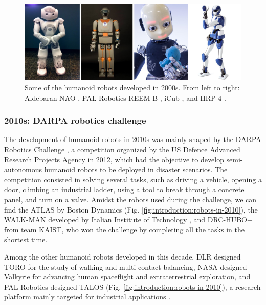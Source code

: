 \begin{figure}
    \centering
    \includegraphics[width=\textwidth]{figures/01-introduction/robots-in-2000.jpg}
    \caption{Some of the humanoid robots developed in 2000s. From left to right:
        Aldebaran NAO \cite{Gouaillier2008NAOHumanoid},
        PAL Robotics REEM-B \cite{Tellez2008REEMB},
        iCub \cite{Metta2010iCubHumanoid}, and
        HRP-4 \cite{Kaneko2011HRP4}.
    }
    \label{fig:introduction:robots-in-2000}
\end{figure}

\subsubsection{2010s: DARPA robotics challenge}
The development of humanoid robots in 2010s was mainly shaped by the DARPA
Robotics Challenge \cite{Atkeson2018DARPARoboticsChallenge}, a competition 
organized by the US Defence Advanced Research Projects Agency in 2012, which 
had the objective to develop semi-autonomous humanoid robots to be deployed
in disaster scenarios. The competition consisted in solving several tasks,
such as driving a vehicle, opening a door, climbing an industrial ladder, 
using a tool to break through a concrete panel, and turn on a valve.
Amidst the robots used during the challenge, we can find the ATLAS by 
Boston Dynamics (Fig. \ref{fig:introduction:robots-in-2010}), the WALK-MAN 
developed by Italian Institute of Technology \cite{Tsagarakis2017WALKMAN},
and DRC-HUBO+ \cite{Jung2018DRCHUBO} from team KAIST, who won the challenge 
by completing all the tasks in the shortest time.

Among the other humanoid robots developed in this decade, DLR designed TORO
\cite{Englsberger2014TORO} for the study of walking and multi-contact 
balancing, NASA designed Valkyrie \cite{Radford2015Valkyrie} for advancing 
human spaceflight and extraterrestrial exploration, and PAL Robotics designed 
TALOS (Fig. \ref{fig:introduction:robots-in-2010}), a research platform mainly
targeted for industrial applications \cite{Stasse2017TALOS}.

